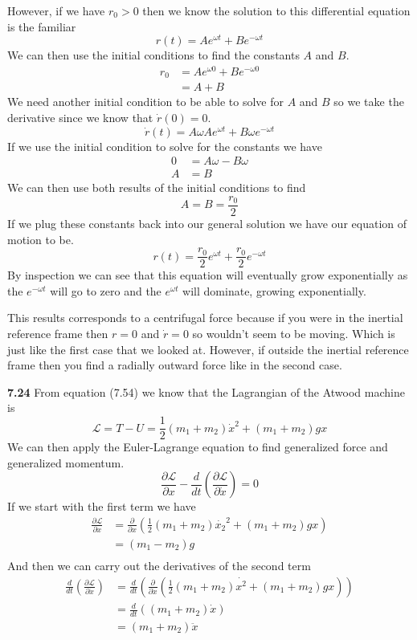 \documentclass[11pt, leqno]{article}
\begin{document}
However, if we have $r_0 > 0$ then we know the solution to this differential equation is the familiar 
$$
r(t) = A e^{\omega t} + B e^{-\omega t}
$$
We can then use the initial conditions to find the constants $A$ and $B$. 
\begin{align*}
r_0 &= A  e^{\omega 0} + B e^{-\omega 0} \\
&= A + B 
\end{align*}
We need another initial condition to be able to solve for $A$ and $B$ so we take the derivative since we know that $\dot{r}(0) = 0$. 
$$
\dot{r}(t) = A \omega A e^{\omega t} + B \omega e^{-\omega t}
$$
If we use the initial condition to solve for the constants we have 
\begin{align*}
0 &= A \omega - B \omega  \\
A &= B 
\end{align*}
We can then use both results of the initial conditions to find 
$$
A = B = \frac{r_0}{2}
$$
If we plug these constants back into our general solution we have our equation of motion to be. 
$$ 
\boxed{r(t) = \frac{r_0}{2}e^{\omega t} + \frac{r_0}{2} e^{-\omega t} }
$$
By inspection we can see that this equation will eventually grow exponentially as the $e^{-\omega t}$ will go to zero and the $e^{\omega t}$ will dominate, growing exponentially. 

This results corresponds to a centrifugal force because if you were in the inertial reference frame then $r= 0$ and $\dot{r} = 0$ so wouldn't seem to be moving. Which is just like the first case that we looked at. However, if outside the inertial reference frame then you find a radially outward force like in the second case. 





\bigskip 
\noindent \textbf{7.24}
From equation (7.54) we know that the Lagrangian of the Atwood machine is
$$
\mathcal{L} = T - U = \frac{1}{2}(m_1 + m_2)\dot{x}^2 + (m_1 + m_2)gx 
$$ 
We can then apply the Euler-Lagrange equation to find generalized force and generalized momentum. 
$$
\frac{\partial \mathcal{L}}{\partial x} - \frac{d}{dt}\left(\frac{\partial \mathcal{L}}{\partial \dot{x}}\right)= 0 
$$ 
If we start with the first term we have 
\begin{align*}
\frac{\partial \mathcal{L}}{\partial x} &= \frac{\partial}{\partial x}\left( \frac{1}{2}(m_1 + m_2)\dot{x_2}^2 + (m_1 + m_2)gx  \right) \\ 
&= (m_1 - m_2)g \\
\end{align*}
And then we can carry out the derivatives of the second term 
\begin{align*}
\frac{d}{dt}\left(\frac{\partial \mathcal{L}}{\partial \dot{x}}\right) &=  \frac{d}{dt}\left(\frac{\partial }{\partial \dot{x}} \left( \frac{1}{2}(m_1 + m_2)\dot{x^2} + (m_1 + m_2)gx \right) \right) \\
&= \frac{d}{dt}((m_1 + m_2)\dot{x}) \\ 
&= (m_1 + m_2)\ddot{x} \\
\end{align*}
\end{document}
